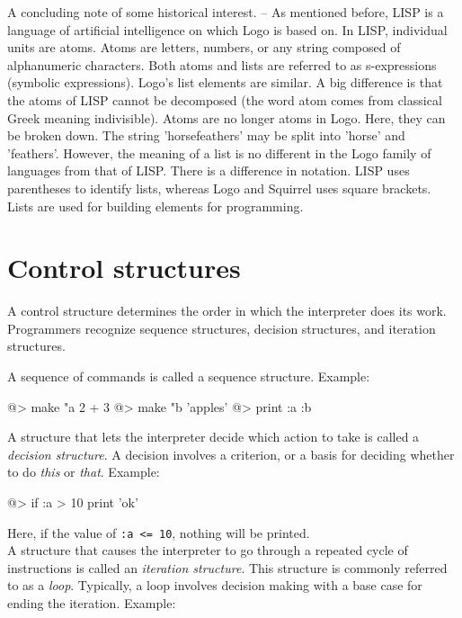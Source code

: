 A concluding note of some historical interest. -- As mentioned before, LISP is a language of artificial intelligence on which Logo is based on.  In LISP, individual units are atoms.  Atoms are letters, numbers, or any string composed of alphanumeric characters.  Both atoms and lists are referred to as s-expressions (symbolic expressions).  Logo's list elements are similar.  A big difference is that the atoms of LISP cannot be decomposed (the word atom comes from classical Greek meaning indivisible).  Atoms are no longer atoms in Logo.  Here, they can be broken down.  The string 'horsefeathers' may be split into 'horse' and 'feathers'.  However, the meaning of a list is no different in the Logo family of languages from that of LISP.  There is a difference in notation.  LISP uses parentheses to identify lists, whereas Logo and Squirrel uses square brackets.  Lists are used for building elements for programming.
   
\section{Control structures} 

A control structure determines the order in which the interpreter does its work. Programmers recognize sequence structures, decision structures, and iteration structures. 
 
A sequence of commands is called a sequence structure.  Example: 
 
\begin{verbatimtab}
@> make "a 2 + 3 
@> make "b 'apples' 
@> print :a :b
\end{verbatimtab}
 
A structure that lets the interpreter decide which action to take is called a {\em decision structure}. 
A decision involves a criterion, or a basis for deciding whether to do {\em this} or {\em that}. Example: 
 
\begin{verbatimtab}
@> if :a > 10 {print 'ok'} 
\end{verbatimtab}

Here, if the value of \verb+:a <= 10+, nothing will be printed.\\ 
 
A structure that causes the interpreter to go through a repeated cycle of instructions is called an {\em iteration structure}.  This structure is commonly referred to as a {\em loop}.  Typically, a loop involves decision making with a base case for ending the iteration.  Example: 

